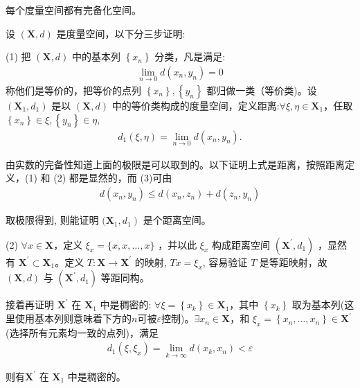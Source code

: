 \begin{theorem}
    每个度量空间都有完备化空间。
\end{theorem}
\begin{solution}
    设 $(\mathbf{X}, d)$ 是度量空间，以下分三步证明:
    
    (1) 把 $(\mathbf{X}, d)$ 中的基本列 $\left\{x_n\right\}$ 分类，凡是满足:
    \begin{align*}
        \lim\limits_{n \rightarrow 0} d\left(x_n, y_n\right)=0
    \end{align*}
    称他们是等价的，把等价的点列 $\left\{x_n\right\},\left\{y_n\right\}$ 都归做一类（等价类)。设 $\left(\mathbf{X}_1, d_1\right)$ 是以 $(\mathbf{X}, d)$ 中的等价类构成的度量空间，定义距离:$\forall \xi, \eta \in \mathbf{X}_1$，任取 $\left\{x_n\right\} \in \xi,\left\{y_n\right\} \in \eta$,
    \begin{align*}
        d_1(\xi, \eta)=\lim\limits_{n \rightarrow 0} d\left(x_n, y_n\right) .
    \end{align*}
    
    由实数的完备性知道上面的极限是可以取到的。以下证明上式是距离，按照距离定义，(1) 和 (2) 都是显然的，而 (3)可由
    \begin{align*}
        d\left(x_n, y_n\right) \leq d\left(x_n, z_n\right)+d\left(z_n, y_n\right)
    \end{align*}

    取极限得到, 则能证明 $(\left.\mathbf{X}_1, d_1\right)$ 是个距离空间。
    
    (2) $\forall x \in \mathbf{X}$，定义 $\xi_x=\{x, x, \ldots, x\}$ ，并以此 $\xi_x$ 构成距离空间 $\left(\mathbf{X}^{\prime}, d_1\right)$ ，显然有 $\mathbf{X}^{\prime} \subset \mathbf{X}_1$。定义 $T: \mathbf{X} \rightarrow \mathbf{X}^{\prime}$ 的映射, $T x=\xi_x$, 容易验证 $T$ 是等距映射，故 $(\mathbf{X}, d)$ 与 $\left(\mathbf{X}^{\prime}, d_1\right)$ 等距同构。
    
    接着再证明 $\mathbf{X}^{\prime}$ 在 $\mathbf{X}_1$ 中是稠密的: $\forall \xi=\left\{x_k\right\} \in \mathbf{X}_1$，其中 $\left\{x_k\right\}$ 取为基本列(这里使用基本列则意味着下方的$n$可被$\varepsilon$控制)。$\exists x_n \in \mathbf{X}$，和 $\xi_x=\left\{x_n, \ldots, x_n\right\} \in \mathbf{X}^{\prime}$(选择所有元素均一致的点列)，满足
    \begin{align*}
        d_1\left(\xi, \xi_x\right)=\lim\limits_{k \rightarrow \infty} d\left(x_k, x_n\right)<\varepsilon
    \end{align*}

    则有$\mathbf{X}^{\prime}$ 在 $\mathbf{X}_1$ 中是稠密的。


\end{solution}
